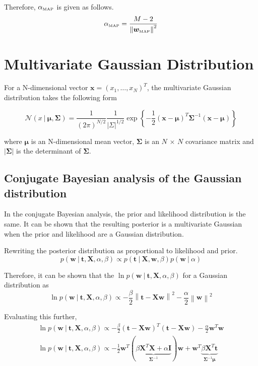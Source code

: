 \documentclass[11pt]{article}
\newcommand{\map}[1]{{#1}_{\text{\tiny MAP}}}
\newcommand\given[1][]{\:#1\vert\:}
\newcommand{\norm}[1]{\left\lVert#1\right\rVert}
\begin{document}
Therefore, $\map{\alpha}$ is given as follows.
\begin{equation}\label{alpha_map}
    \map{\alpha} = \frac{M-2}{\norm{\map{\bm{w}}}^2}
\end{equation}

\section{Multivariate Gaussian Distribution}
For a N-dimensional vector $\bm{x} = (x_1, \ldots, x_N)^T$, the multivariate Gaussian distribution takes the following form

\begin{equation}
    \mathcal{N}(x \given \bm{\mu}, \bm{\Sigma}) = \frac{1}{(2\pi)^{N/2}}\frac{1}{|\Sigma|^{1/2}}\exp{\left\{-\frac{1}{2}\left(\bm{x} - \bm{\mu} \right)^T\bm{\Sigma}^{-1}\left(\bm{x} - \bm{\mu} \right)\right\}}
\end{equation}

where $\bm{\mu}$ is an N-dimensional mean vector, $\bm{\Sigma}$ is an $N$ $\times$ $N$ covariance matrix and $|\bm{\Sigma}|$ is the determinant of $\bm{\Sigma}$.

\subsection{Conjugate Bayesian analysis of the Gaussian distribution}
In the conjugate Bayesian analysis, the prior and likelihood distribution is the same. It can be shown that the resulting posterior is a multivariate Gaussian when the prior and likelihood are a Gaussian distribution. 

Rewriting the posterior distribution as proportional to likelihood and prior.
\begin{equation}
    p(\bm{w} \given \bm{t}, \bm{X}, \alpha, \beta) \propto p(\bm{t} \given \bm{X}, \bm{w}, \beta) p(\bm{w} \given \alpha)
\end{equation}

Therefore, it can be shown that the $\ln{p(\bm{w} \given \bm{t}, \bm{X}, \alpha, \beta)}$ for a Gaussian distribution as 
\begin{equation}
    \ln{p(\bm{w} \given \bm{t}, \bm{X}, \alpha, \beta)} \propto - \frac{\beta}{2} \norm{\bm{t} - \bm{Xw}}^2 - \frac{\alpha}{2}\norm{\bm{w}}^2
\end{equation}

Evaluating this further,
\begin{eqnarray}
    \ln{p(\bm{w} \given \bm{t}, \bm{X}, \alpha, \beta)} \propto -\frac{\beta}{2} (\bm{t} - \bm{Xw})^T (\bm{t} - \bm{Xw}) - \frac{\alpha}{2} \bm{w}^T\bm{w}\\
    \ln{p(\bm{w} \given \bm{t}, \bm{X}, \alpha, \beta)} \propto -\frac{1}{2} \bm{w}^T (\underbrace{\beta \bm{X}^T\bm{X} + \alpha \bm{I}}_{\bm{\Sigma}^{-1}}) \bm{w}  + \bm{w}^T\underbrace{\beta\bm{X}^T \bm{t}}_{\bm{\Sigma}^{-1} \bm{\mu}}
\end{eqnarray}
\end{document}
